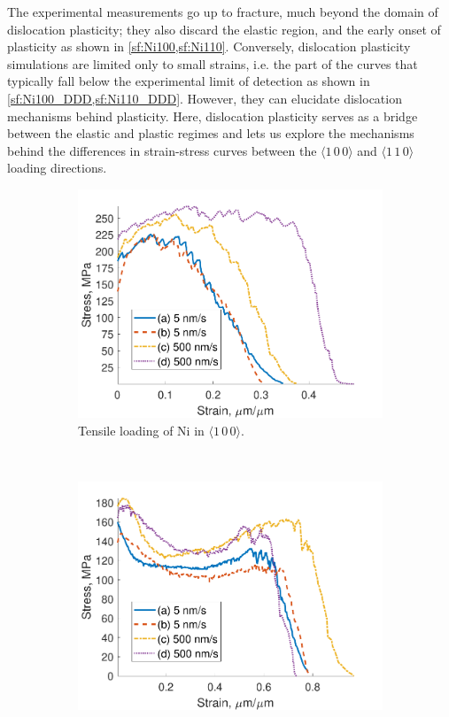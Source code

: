 The experimental measurements go up to fracture, much beyond the domain of dislocation plasticity; they also discard the elastic region, and the early onset of plasticity as shown in \cref{sf:Ni100,sf:Ni110}. Conversely, dislocation plasticity simulations are limited only to small strains, i.e. the part of the curves that typically fall below the experimental limit of detection as shown in \cref{sf:Ni100_DDD,sf:Ni110_DDD}. However, they can elucidate dislocation mechanisms behind plasticity. Here, dislocation plasticity serves as a bridge between the elastic and plastic regimes and lets us explore the mechanisms behind the differences in strain-stress curves between the $\langle 1\,0\,0 \rangle$ and $\langle 1\,1\,0 \rangle$ loading directions.
\begin{figure}
    \centering
    \begin{subfigure}[t]{0.45\linewidth}
        \centering
        \includegraphics[width=\linewidth]{../data/Ni100.pdf}
        \caption[Tensile loading of Ni in $\langle 1\, 0\, 0 \rangle$.]{Tensile loading of Ni in $\langle 1\, 0\, 0 \rangle$.}
        \label{sf:Ni100}
    \end{subfigure}
    ~
    \begin{subfigure}[t]{0.45\linewidth}
        \centering
        \includegraphics[width=\linewidth]{../data/Ni110.pdf}

\end{subfigure}
\end{figure}
